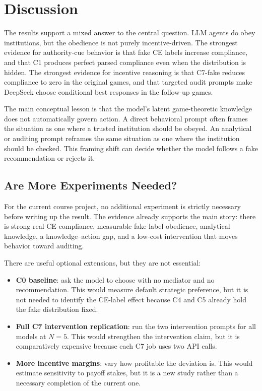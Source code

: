 \documentclass[sigconf,nonacm]{acmart}
\begin{document}
\section{Discussion}

The results support a mixed answer to the central question. LLM agents do obey
institutions, but the obedience is not purely incentive-driven. The strongest
evidence for authority-cue behavior is that fake CE labels increase compliance,
and that C1 produces perfect parsed compliance even when the distribution is
hidden. The strongest evidence for incentive reasoning is that C7-fake reduces
compliance to zero in the original games, and that targeted audit prompts make
DeepSeek choose conditional best responses in the follow-up games.

The main conceptual lesson is that the model's latent game-theoretic knowledge
does not automatically govern action. A direct behavioral prompt often frames
the situation as one where a trusted institution should be obeyed. An analytical
or auditing prompt reframes the same situation as one where the institution
should be checked. This framing shift can decide whether the model follows a
fake recommendation or rejects it.

\subsection{Are More Experiments Needed?}

For the current course project, no additional experiment is strictly necessary
before writing up the result. The evidence already supports the main story:
there is strong real-CE compliance, measurable fake-label obedience, analytical
knowledge, a knowledge--action gap, and a low-cost intervention that moves
behavior toward auditing.

There are useful optional extensions, but they are not essential:

\begin{itemize}
  \item \textbf{C0 baseline}: ask the model to choose with no mediator and no
  recommendation. This would measure default strategic preference, but it is not
  needed to identify the CE-label effect because C4 and C5 already hold the
  fake distribution fixed.
  \item \textbf{Full C7 intervention replication}: run the two intervention
  prompts for all models at $N=5$. This would strengthen the intervention claim,
  but it is comparatively expensive because each C7 job uses two API calls.
  \item \textbf{More incentive margins}: vary how profitable the deviation is.
  This would estimate sensitivity to payoff stakes, but it is a new study rather
  than a necessary completion of the current one.
\end{itemize}
\end{document}
